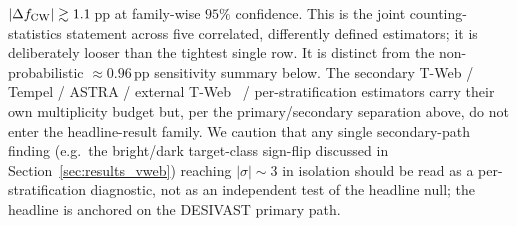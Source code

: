 \documentclass[aps,prd,twocolumn,superscriptaddress,showpacs,preprintnumbers,nofootinbib,longbibliography,floatfix]{revtex4-2}
\begin{document}
$|\Delta f_{\rm CW}| \gtrsim 1.1$\,pp at family-wise $95\%$ confidence.
This is the joint counting-statistics statement across five correlated,
differently defined estimators; it is deliberately looser than the
tightest single row. It is distinct from the non-probabilistic
${\approx}0.96$\,pp sensitivity summary below. The secondary T-Web / Tempel / ASTRA
/ external T-Web~\cite{TWebDESI2026} / per-stratification estimators carry their own multiplicity
budget but, per the primary/secondary separation above, do not enter
the headline-result family. We caution that any single secondary-path
finding (e.g.\ the bright/dark target-class sign-flip discussed in
Section~\ref{sec:results_vweb}) reaching $|\sigma| \sim 3$ in
isolation should be read as a per-stratification diagnostic, not as
an independent test of the headline null; the headline is anchored on
the DESIVAST primary path.
\end{document}
